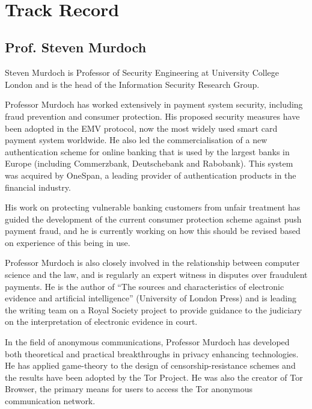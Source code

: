 
\



\section{Track Record}

\subsection{Prof. Steven Murdoch}

Steven Murdoch is Professor of Security Engineering at University College London and is the head of the Information Security Research Group. 

Professor Murdoch has worked extensively in payment system security, including fraud prevention and consumer protection.
His proposed security measures have been adopted in the EMV protocol, now the most widely used smart card payment system worldwide.
He also led the commercialisation of a new authentication scheme for online banking that is used by the largest banks in Europe (including Commerzbank, Deutschebank and Rabobank).
This system was acquired by OneSpan, a leading provider of authentication products in the financial industry.

His work on protecting vulnerable banking customers from unfair treatment has guided the development of the current consumer protection scheme against push payment fraud, and he is currently working on how this should be revised based on experience of this being in use.

Professor Murdoch is also closely involved in the relationship between computer science and the law, and is regularly an expert witness in disputes over fraudulent payments.
He is the author of ``The sources and characteristics of electronic evidence and artificial intelligence'' (University of London Press) and is leading the writing team on a Royal Society
project to provide guidance to the judiciary on the interpretation of electronic evidence in court.

In the field of anonymous communications, Professor Murdoch has developed both theoretical and practical breakthroughs in privacy enhancing technologies.
He has applied game-theory to the design of censorship-resistance schemes and the results have been adopted by the Tor Project.
He was also the creator of Tor Browser, the primary means for users to access the Tor anonymous communication network.


